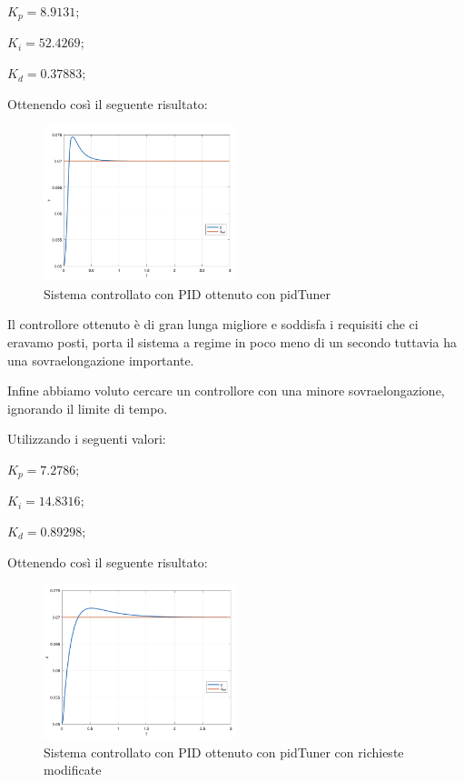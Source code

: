 \documentclass{article}
\newcommand{\spacer}[1][8pt]{
    \par\vspace{#1}
}
\begin{document}
$K_p = 8.9131;$

$K_i = 52.4269;$

$K_d = 0.37883;$

\spacer
Ottenendo così il seguente risultato:

\begin{figure}[H]
    \centering
    \includegraphics[width = 0.5\textwidth]{Images/PID-tuner.png}
    \caption{Sistema controllato con PID ottenuto con pidTuner}
    \label{fig:pidTuner-PID}
\end{figure}

Il controllore ottenuto è di gran lunga migliore e soddisfa i requisiti che ci eravamo posti, porta il sistema a regime in poco meno di un secondo tuttavia ha una sovraelongazione importante.

\spacer
Infine abbiamo voluto cercare un controllore con una minore sovraelongazione, ignorando il limite di tempo.

Utilizzando i seguenti valori:

$K_p = 7.2786;$

$K_i = 14.8316;$

$K_d = 0.89298;$

\spacer
Ottenendo così il seguente risultato:

\begin{figure}[H]
    \centering
    \includegraphics[width = 0.5\textwidth]{Images/PID-tuner-overshoot.png}
    \caption{Sistema controllato con PID ottenuto con pidTuner con richieste modificate}
    \label{fig:pidTuner-PID-overshoot}
\end{figure}
\end{document}

